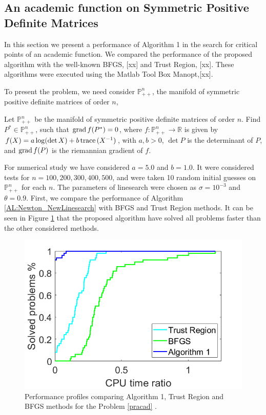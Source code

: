 \subsection{An academic function on Symmetric Positive Definite Matrices }

In this section we present a performance of Algorithm 1 in the search for critical points of an academic function. We compared the performance of the proposed algorithm with the well-known BFGS, [xx] and Trust Region, [xx]. These algorithms were executed using the Matlab Tool Box Manopt,[xx].

 To present the problem, we need consider  $ \mathbb{P}^n_{++}$, the manifold of symmetric positive definite matrices of order $n$,

\begin{problem}\label{pracad} Let $ \mathbb{P}^n_{++}$ be the manifold of symmetric positive definite matrices of order $n$.  Find $P^* \in \mathbb{P}^n_{++}$, such that $\operatorname{grad} f(P^*) =0$, where $f:\mathbb{P}^n_{++} \to \mathbb{R}$ is given by  $f(X) = a \log(\det X) + b \,\mbox{trace}\, (X^{-1})$, with $a,b > 0$, $\det P$ is the determinant of $P$,   and $\operatorname{grad} f(P)$ is the riemannian gradient of $f$.
\end{problem}


For numerical study we have considered $a = 5.0$ and $b = 1.0$. It were considered tests for  $n=100,200,300,400,500$, and were taken 10 random initial guesses on $\mathbb{P}^n_{++}$ for each $n$. The parameters of linesearch were chosen as $\sigma = 10^{-3}$ and $\theta = 0.9$.
First, we compare the performance of Algorithm \ref{AL:Newton_NewLinesearch} with BFGS and Trust Region methods. It can be seen in Figure \ref{fig:logdetperformance} that the proposed algorithm have solved all problems faster than the other considered methods.


\begin{figure}
	\centering
	\includegraphics[scale=0.5]{logdetpp.png}
	\caption{Performance profiles comparing Algorithm 1, Trust Region and BFGS methods for the Problem \ref{pracad} .}
	\label{fig:logdetperformance}
\end{figure}


